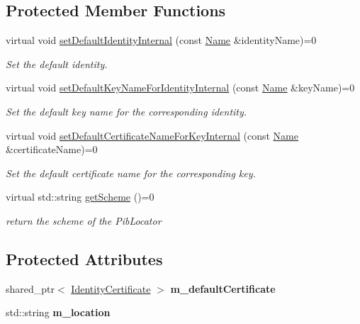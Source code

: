 \subsection*{Protected Member Functions}
\begin{DoxyCompactItemize}
\item 
virtual void \hyperlink{classndn_1_1SecPublicInfo_ad0afde1ac4337e0a43d4b20548cdd68b}{set\+Default\+Identity\+Internal} (const \hyperlink{classndn_1_1Name}{Name} \&identity\+Name)=0
\begin{DoxyCompactList}\small\item\em Set the default identity. \end{DoxyCompactList}\item 
virtual void \hyperlink{classndn_1_1SecPublicInfo_ac1259f5ef2c83be74a08073e6dbc01ae}{set\+Default\+Key\+Name\+For\+Identity\+Internal} (const \hyperlink{classndn_1_1Name}{Name} \&key\+Name)=0
\begin{DoxyCompactList}\small\item\em Set the default key name for the corresponding identity. \end{DoxyCompactList}\item 
virtual void \hyperlink{classndn_1_1SecPublicInfo_a79a8876553a9f31f6b2d3318f95020a7}{set\+Default\+Certificate\+Name\+For\+Key\+Internal} (const \hyperlink{classndn_1_1Name}{Name} \&certificate\+Name)=0
\begin{DoxyCompactList}\small\item\em Set the default certificate name for the corresponding key. \end{DoxyCompactList}\item 
virtual std\+::string \hyperlink{classndn_1_1SecPublicInfo_a3ee834a1e4414a9947574f91fa06d06b}{get\+Scheme} ()=0\hypertarget{classndn_1_1SecPublicInfo_a3ee834a1e4414a9947574f91fa06d06b}{}\label{classndn_1_1SecPublicInfo_a3ee834a1e4414a9947574f91fa06d06b}

\begin{DoxyCompactList}\small\item\em return the scheme of the Pib\+Locator \end{DoxyCompactList}\end{DoxyCompactItemize}
\subsection*{Protected Attributes}
\begin{DoxyCompactItemize}
\item 
shared\+\_\+ptr$<$ \hyperlink{classndn_1_1IdentityCertificate}{Identity\+Certificate} $>$ {\bfseries m\+\_\+default\+Certificate}\hypertarget{classndn_1_1SecPublicInfo_a4325b350c889385783173175268ee7f8}{}\label{classndn_1_1SecPublicInfo_a4325b350c889385783173175268ee7f8}

\item 
std\+::string {\bfseries m\+\_\+location}\hypertarget{classndn_1_1SecPublicInfo_a3d32be691e554313edcfcd44f5a92a12}{}\label{classndn_1_1SecPublicInfo_a3d32be691e554313edcfcd44f5a92a12}

\end{DoxyCompactItemize}



